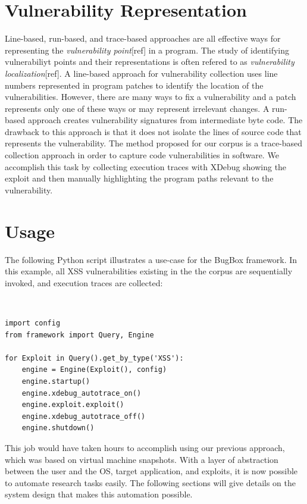 \documentclass[letterpaper,twocolumn,10pt]{article}
\begin{document}
\section{Vulnerability Representation}


Line-based, run-based, and trace-based approaches are all effective ways for representing the \emph{vulnerability point}[ref] in a program.  The study of identifying vulnerabiliyt points and their representations is often refered to as \emph{vulnerability localization}[ref].  A line-based\cite{4630094} approach for vulnerability collection uses line numbers represented in program patches to identify the location of the vulnerabilities.  However, there are many ways to fix a vulnerability and a patch represents only one of these ways or may represent irrelevant changes.  A run-based\cite{Song:2008:BNA:1496255.1496257} approach creates vulnerability signatures from intermediate byte code.  The drawback to this approach is that it does not isolate the lines of source code that represents the vulnerability.  The method proposed for our corpus is a trace-based collection approach in order to capture code vulnerabilities in software.  We accomplish this task by collecting execution traces with XDebug showing the exploit and then manually highlighting the program paths relevant to the vulnerability.

\section{Usage}

The following Python script illustrates a use-case for the BugBox framework. In this example, all XSS vulnerabilities existing in the the corpus are sequentially invoked, and execution traces are collected:

{\tt \footnotesize
\begin{verbatim}
import config
from framework import Query, Engine

for Exploit in Query().get_by_type('XSS'):
    engine = Engine(Exploit(), config)
    engine.startup()
    engine.xdebug_autotrace_on()
    engine.exploit.exploit()
    engine.xdebug_autotrace_off()
    engine.shutdown()
\end{verbatim}
}

This job would have taken hours to accomplish using our previous approach, which was based on virtual machine snapshots. With a layer of abstraction between the user and the OS, target application, and exploits, it is now possible to automate research tasks easily. The following sections will give details on the system design that makes this automation possible.
\\
\end{document}
